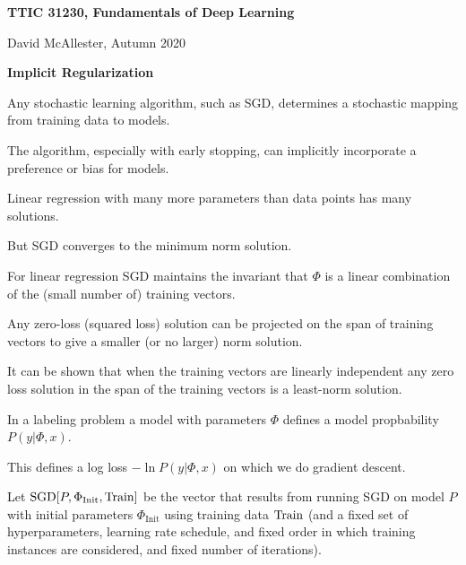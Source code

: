 





{\Huge


\centerline{\bf TTIC 31230, Fundamentals of Deep Learning}
\bigskip
\centerline{David McAllester, Autumn 2020}

\vfill
\centerline{\bf Implicit Regularization}
\vfill
\vfill


Any stochastic learning algorithm, such as SGD, determines a stochastic mapping from training data to models.

\vfill
The algorithm, especially with early stopping, can implicitly incorporate a preference or bias for models.


Linear regression with many more parameters than data points
has many solutions.

\vfill
But SGD converges to the minimum norm solution.


For linear regression SGD maintains the invariant that $\Phi$ is a linear combination of the (small number of) training vectors.

\vfill
Any zero-loss (squared loss) solution can be projected on the span of training vectors to give a smaller (or no larger) norm solution.

\vfill
It can be shown that when the training vectors are linearly independent any zero loss solution in the span of the training vectors is a least-norm solution.


In a labeling problem a model with parameters $\Phi$ defines a model propbability $P(y|\Phi,x)$.

\vfill
This defines a log loss $-\ln P(y|\Phi,x)$ on which we do gradient descent.

\vfill
Let {\color{red} $\mathrm{SGD}\!\left[P,\Phi_{\mathrm{Init}},\mathrm{Train}\right]$} be the vector that results from running SGD on model $P$ with initial parameters $\Phi_{\mathrm{Init}}$
using training data $\mathrm{Train}$ (and a fixed set of hyperparameters, learning rate schedule, and fixed order in which training instances are considered,
and fixed number of iterations).



}
